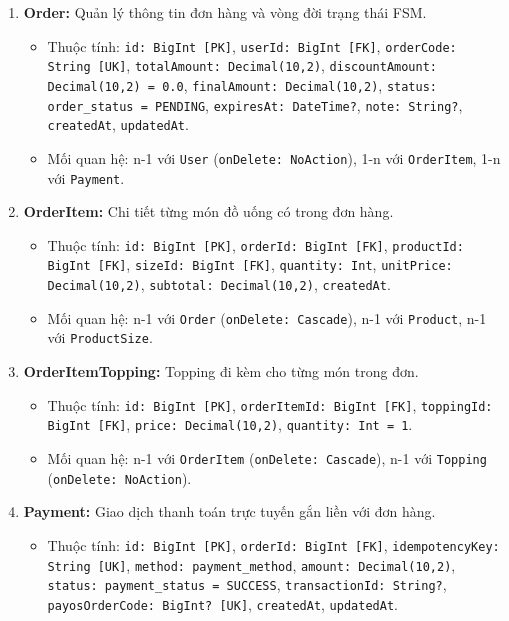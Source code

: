 \documentclass[11pt,a4paper]{article}
\begin{document}
\begin{enumerate}[leftmargin=*,resume]
    \item \textbf{Order:} Quản lý thông tin đơn hàng và vòng đời trạng thái FSM.
    \begin{itemize}[leftmargin=*,noitemsep]
        \item Thuộc tính: \texttt{id: BigInt [PK]}, \texttt{userId: BigInt [FK]}, \texttt{orderCode: String [UK]}, \texttt{totalAmount: Decimal(10,2)}, \texttt{discountAmount: Decimal(10,2) = 0.0}, \texttt{finalAmount: Decimal(10,2)}, \texttt{status: order\_status = PENDING}, \texttt{expiresAt: DateTime?}, \texttt{note: String?}, \texttt{createdAt}, \texttt{updatedAt}.
        \item Mối quan hệ: n-1 với \texttt{User} (\texttt{onDelete: NoAction}), 1-n với \texttt{OrderItem}, 1-n với \texttt{Payment}.
    \end{itemize}
    \item \textbf{OrderItem:} Chi tiết từng món đồ uống có trong đơn hàng.
    \begin{itemize}[leftmargin=*,noitemsep]
        \item Thuộc tính: \texttt{id: BigInt [PK]}, \texttt{orderId: BigInt [FK]}, \texttt{productId: BigInt [FK]}, \texttt{sizeId: BigInt [FK]}, \texttt{quantity: Int}, \texttt{unitPrice: Decimal(10,2)}, \texttt{subtotal: Decimal(10,2)}, \texttt{createdAt}.
        \item Mối quan hệ: n-1 với \texttt{Order} (\texttt{onDelete: Cascade}), n-1 với \texttt{Product}, n-1 với \texttt{ProductSize}.
    \end{itemize}
    \item \textbf{OrderItemTopping:} Topping đi kèm cho từng món trong đơn.
    \begin{itemize}[leftmargin=*,noitemsep]
        \item Thuộc tính: \texttt{id: BigInt [PK]}, \texttt{orderItemId: BigInt [FK]}, \texttt{toppingId: BigInt [FK]}, \texttt{price: Decimal(10,2)}, \texttt{quantity: Int = 1}.
        \item Mối quan hệ: n-1 với \texttt{OrderItem} (\texttt{onDelete: Cascade}), n-1 với \texttt{Topping} (\texttt{onDelete: NoAction}).
    \end{itemize}
    \item \textbf{Payment:} Giao dịch thanh toán trực tuyến gắn liền với đơn hàng.
    \begin{itemize}[leftmargin=*,noitemsep]
        \item Thuộc tính: \texttt{id: BigInt [PK]}, \texttt{orderId: BigInt [FK]}, \texttt{idempotencyKey: String [UK]}, \texttt{method: payment\_method}, \texttt{amount: Decimal(10,2)}, \texttt{status: payment\_status = SUCCESS}, \texttt{transactionId: String?}, \texttt{payosOrderCode: BigInt? [UK]}, \texttt{createdAt}, \texttt{updatedAt}.

\end{itemize}
\end{enumerate}
\end{document}
